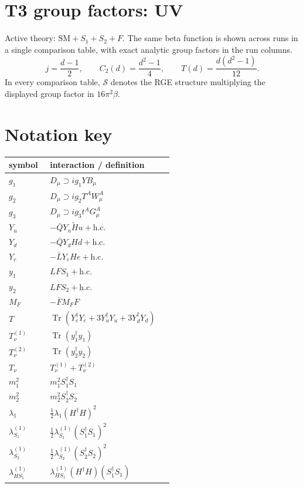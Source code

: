 \documentclass[9pt]{article}
\begin{document}
\section*{T3 group factors: UV}
Active theory: $\mathrm{SM}+S_1+S_2+F$.  The same beta function is shown across runs in a single comparison table, with exact analytic group factors in the run columns.
\[j=\frac{d-1}{2},\qquad C_2(d)=\frac{d^2-1}{4},\qquad T(d)=\frac{d(d^2-1)}{12}.\]
In every comparison table, $\mathcal{S}$ denotes the RGE structure multiplying the displayed group factor in $16\pi^2\beta$.
\section*{Notation key}
\begin{longtable}{@{}p{0.23\linewidth}p{0.69\linewidth}@{}}
\toprule
symbol & interaction / definition \\
\midrule
$g_1$ & $D_\mu\supset i g_1YB_\mu$ \\
$g_2$ & $D_\mu\supset i g_2T^AW_\mu^A$ \\
$g_3$ & $D_\mu\supset i g_3t^AG_\mu^A$ \\
$Y_u$ & $-\bar QY_u\widetilde Hu+\mathrm{h.c.}$ \\
$Y_d$ & $-\bar QY_dHd+\mathrm{h.c.}$ \\
$Y_e$ & $-\bar LY_eHe+\mathrm{h.c.}$ \\
$y_1$ & $LFS_1+\mathrm{h.c.}$ \\
$y_2$ & $LFS_2+\mathrm{h.c.}$ \\
$M_F$ & $-\bar FM_FF$ \\
$T$ & $\operatorname{Tr}(Y_e^\dagger Y_e+3Y_u^\dagger Y_u+3Y_d^\dagger Y_d)$ \\
$T_\nu^{(1)}$ & $\operatorname{Tr}(y_1^\dagger y_1)$ \\
$T_\nu^{(2)}$ & $\operatorname{Tr}(y_2^\dagger y_2)$ \\
$T_\nu$ & $T_\nu^{(1)}+T_\nu^{(2)}$ \\
$m_1^2$ & $m_1^2S_1^\dagger S_1$ \\
$m_2^2$ & $m_2^2S_2^\dagger S_2$ \\
$\lambda_1$ & $\frac12\lambda_1(H^\dagger H)^2$ \\
$\lambda_{S_1}^{(1)}$ & $\frac12\lambda_{S_1}^{(1)}(S_1^\dagger S_1)^2$ \\
$\lambda_{S_2}^{(1)}$ & $\frac12\lambda_{S_2}^{(1)}(S_2^\dagger S_2)^2$ \\
$\lambda_{HS_1}^{(1)}$ & $\lambda_{HS_1}^{(1)}(H^\dagger H)(S_1^\dagger S_1)$ \\

\end{longtable}
\end{document}
